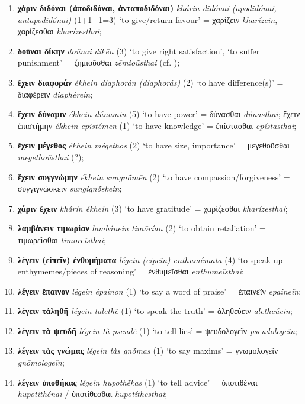 \documentclass[output=paper,colorlinks,citecolor=brown]{langscibook}
\begin{document}
\begin{enumerate}
    \item \textbf{χάριν διδόναι (ἀποδιδόναι, ἀνταποδιδόναι)} \textit{khárin didónai (apodidónai, antapodidónai)} (1+1+1=3) ‘to give/return favour' = χαρίζειν \textit{kharízein}, χαρίζεσθαι \textit{kharízesthai};
    \item \textbf{δοῦναι δίκην} \textit{doũnai díkēn} (3) ‘to give right satisfaction', ‘to suffer punishment' = ζημιοῦσθαι \textit{zēmioũsthai} (cf. );
    \item \textbf{ἔχειν διαφοράν} \textit{ékhein diaphorán (diaphorás)} (2) ‘to have difference(s)' = διαφέρειν \textit{diaphérein};
    \item \textbf{ἔχειν δύναμιν} \textit{ékhein dúnamin} (5) ‘to have power' = δύνασθαι \textit{dúnasthai};
    ἔχειν ἐπιστήμην \textit{ékhein epistḗmēn} (1) ‘to have knowledge' = ἐπίστασθαι \textit{epístasthai};
    \item \textbf{ἔχειν μέγεθος} \textit{ékhein mégethos} (2) ‘to have size, importance' = μεγεθοῦσθαι \textit{megethoũsthai} (?);
    \item \textbf{ἔχειν συγγνώμην} \textit{ékhein sungnṓmēn} (2) ‘to have compassion/forgiveness' = συγγιγνώσκειν \textit{sungignṓskein};
    \item \textbf{χάριν ἔχειν} \textit{khárin ékhein} (3) ‘to have gratitude' = χαρίζεσθαι \textit{kharízesthai};
    \item \textbf{λαμβάνειν τιμωρίαν} \textit{lambánein timōrían} (2) ‘to obtain retaliation' = τιμωρεῖσθαι \textit{timōreĩsthai};
    \item \textbf{λέγειν (εἰπεῖν) ἐνθυμήματα} \textit{légein (eipeĩn) enthumḗmata} (4) ‘to speak up enthymemes/pieces of reasoning' = ἐνθυμεῖσθαι \textit{enthumeĩsthai};
    \item \textbf{λέγειν ἔπαινον} \textit{légein épainon} (1) ‘to say a word of praise' = ἐπαινεῖν \textit{epaineĩn};
    \item \textbf{λέγειν τἀληθῆ} \textit{légein talēthē̃} (1) ‘to speak the truth' = ἀληθεύειν \textit{alētheúein};
    \item \textbf{λέγειν τὰ ψευδῆ} \textit{légein tà pseudē̃} (1) ‘to tell lies' = ψευδολογεῖν \textit{pseudologeĩn};
    \item \textbf{λέγειν τὰς γνώμας} \textit{légein tàs gnṓmas} (1) ‘to say maxims' = γνωμολογεῖν \textit{gnōmologeĩn};
    \item \textbf{λέγειν ὑποθήκας} \textit{légein hupothḗkas} (1) ‘to tell advice' = ὑποτιθέναι \textit{hupotithénai} / ὑποτίθεσθαι \textit{hupotíthesthai};

\end{enumerate}
\end{document}

